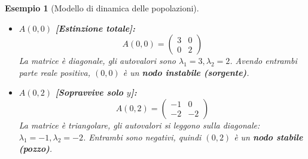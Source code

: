\documentclass[openany]{book}
\newtheorem*{esempio}{Esempio}
\theoremstyle{definition}
\theoremstyle{remark}
\begin{document}
\begin{esempio}[Modello di dinamica delle popolazioni]
\begin{minipage}{0.65\textwidth}
\begin{itemize}
    \item \textbf{$A(0,0)$ [Estinzione totale]:}
    $$ A(0,0) = \begin{pmatrix} 3 & 0 \\ 0 & 2 \end{pmatrix} $$
    La matrice è diagonale, gli autovalori sono $\lambda_1 = 3, \lambda_2 = 2$. Avendo entrambi parte reale positiva, $(0,0)$ è un \textbf{nodo instabile (sorgente)}.
\end{itemize}
\end{minipage}
\begin{minipage}{0.3\textwidth}
\begin{center}
\end{center}
\end{minipage}

\vspace{0.3cm}
\begin{minipage}{0.65\textwidth}
\begin{itemize}
    \item \textbf{$A(0,2)$ [Sopravvive solo $y$]:}
    $$ A(0,2) = \begin{pmatrix} -1 & 0 \\ -2 & -2 \end{pmatrix} $$
    La matrice è triangolare, gli autovalori si leggono sulla diagonale: $\lambda_1 = -1, \lambda_2 = -2$. Entrambi sono negativi, quindi $(0,2)$ è un \textbf{nodo stabile (pozzo)}.
\end{itemize}
\end{minipage}
\begin{minipage}{0.3\textwidth}
\begin{center}
\end{center}
\end{minipage}


\end{esempio}
\end{document}

